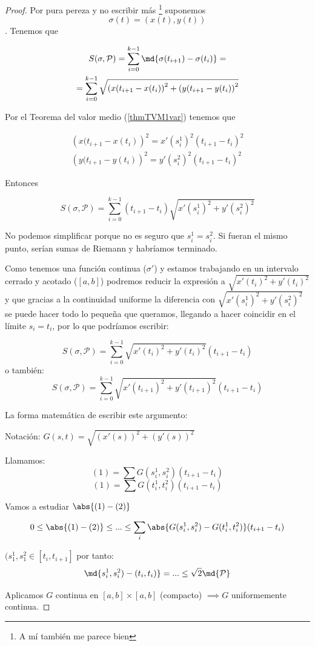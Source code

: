 \begin{proof} Por pura pereza y no escribir más \footnote{A mí también me parece bien} suponemos \[ \sigma(t) = (x(t),y(t)) \]. Tenemos que

\begin{gather*}
 S(\sigma,\mathcal{P}) = \sum_{i=0}^{k-1} \md{\sigma(t_{i+1}) - \sigma(t_i)} = \\
 = \sum_{i=0}^{k-1}\sqrt{\left(x(t_{i+1}-x(t_i)\right)^2 + \left(y(t_{i+1}-y(t_i)\right)^2}
 \end{gather*}
 
 Por el Teorema del valor medio (\ref{thmTVM1var}) tenemos que
 
 \begin{gather*}
 \left(x(t_{i+1}-x(t_i)\right)^2  = x'(s_i^1)^2(t_{i+1}-t_i)^2 \\
 \left(y(t_{i+1}-y(t_i)\right)^2  = y'(s_i^2)^2(t_{i+1}-t_i)^2
 \end{gather*}
 
 Entonces
 
 \[  S(\sigma,\mathcal{P})  = \sum_{i=0}^{k-1}  (t_{i+1}-t_i) \sqrt{x'(s_i^1)^2 + y'(s_i^2)^2} \]
 
 No podemos simplificar porque no es seguro que $s_i^1 = s_i^2$. Si fueran el mismo punto, serían sumas de Riemann y habríamos terminado.
 
 Como tenemos una función continua ($\sigma'$) y estamos trabajando en un intervalo cerrado y acotado ($[a,b]$) podremos reducir la expresión a $\sqrt{x'(t_i)^2 + y'(t_i)^2}$ y que gracias a la continuidad uniforme la diferencia con $\sqrt{x'(s_i^1)^2 + y'(s_i^2)^2}$ se puede hacer todo lo pequeña que queramos, llegando a hacer coincidir en el límite $s_i = t_i$, por lo que podríamos escribir:
 
\[  S(\sigma,\mathcal{P})  = \sum_{i=0}^{k-1} \sqrt{x'(t_i)^2 + y'(t_i)^2} (t_{i+1}-t_i) \]
  o también:
\[  S(\sigma,\mathcal{P})  = \sum_{i=0}^{k-1} \sqrt{x'(t_{i+1})^2 + y'(t_{i+1})^2} (t_{i+1}-t_i) \]


La forma matemática de escribir este argumento:

Notación: $G(s,t) = \sqrt{(x'(s))^2 + (y'(s))^2}$

Llamamos:
\[(1) = \sum G(s_i^1,s_i^2)(t_{i+1}-t_i)\]
\[(1) = \sum G(t_i^1,t_i^2)(t_{i+1}-t_i)\]

Vamos a estudiar $\abs{(1)-(2)}$

\[0\leq \abs{(1)-(2)} \leq ... \leq \sum_i \abs{G(s_i^1,s_i^2)- G(t_i^1,t_i^2)}(t_{i+1}-t_i)\]

$(s_1^1, s_1^2 \in [t_i,t_{i+1}]$ por tanto:
\[\md{s_i^1,s_i^2) - (t_i,t_i)} = ... \leq \sqrt{2}\md{\mathcal{P}}\]

Aplicamos $G$ continua en $[a,b]\times [a,b]$ (compacto) $\implies G$ uniformemente continua.

\end{proof}

